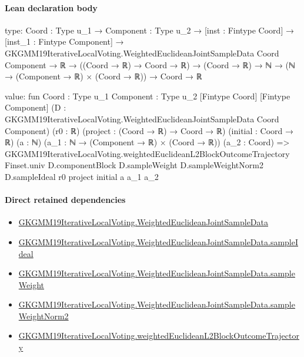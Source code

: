 \documentclass[10pt]{article}
\begin{document}
\paragraph{Lean declaration body}
\begin{ReviewVerbatim}
type:
{Coord : Type u_1} →
  {Component : Type u_2} →
    [inst : Fintype Coord] →
      [inst_1 : Fintype Component] →
        GKGMM19IterativeLocalVoting.WeightedEuclideanJointSampleData Coord Component →
          ℝ → ((Coord → ℝ) → Coord → ℝ) → (Coord → ℝ) → ℕ → (ℕ → (Component → ℝ) × (Coord → ℝ)) → Coord → ℝ

value:
fun {Coord : Type u_1} {Component : Type u_2} [Fintype Coord] [Fintype Component]
    (D : GKGMM19IterativeLocalVoting.WeightedEuclideanJointSampleData Coord Component) (r0 : ℝ)
    (project : (Coord → ℝ) → Coord → ℝ) (initial : Coord → ℝ) (a : ℕ) (a_1 : ℕ → (Component → ℝ) × (Coord → ℝ))
    (a_2 : Coord) =>
  GKGMM19IterativeLocalVoting.weightedEuclideanL2BlockOutcomeTrajectory Finset.univ D.componentBlock D.sampleWeight
    D.sampleWeightNorm2 D.sampleIdeal r0 project initial a a_1 a_2
\end{ReviewVerbatim}

\paragraph{Direct retained dependencies}
\begin{itemize}\raggedright
\item \hyperlink{governing-declaration-b9220a54a8f8ff22}{GKGMM19\allowbreak{}Iterative\allowbreak{}Local\allowbreak{}Voting.\allowbreak{}Weighted\allowbreak{}Euclidean\allowbreak{}Joint\allowbreak{}Sample\allowbreak{}Data}
\item \hyperlink{governing-declaration-0b3dd9036d7079b2}{GKGMM19\allowbreak{}Iterative\allowbreak{}Local\allowbreak{}Voting.\allowbreak{}Weighted\allowbreak{}Euclidean\allowbreak{}Joint\allowbreak{}Sample\allowbreak{}Data.\allowbreak{}sample\allowbreak{}Ideal}
\item \hyperlink{governing-declaration-1e78ab562ae896c2}{GKGMM19\allowbreak{}Iterative\allowbreak{}Local\allowbreak{}Voting.\allowbreak{}Weighted\allowbreak{}Euclidean\allowbreak{}Joint\allowbreak{}Sample\allowbreak{}Data.\allowbreak{}sample\allowbreak{}Weight}
\item \hyperlink{governing-declaration-69fe6a7a24e7eb9f}{GKGMM19\allowbreak{}Iterative\allowbreak{}Local\allowbreak{}Voting.\allowbreak{}Weighted\allowbreak{}Euclidean\allowbreak{}Joint\allowbreak{}Sample\allowbreak{}Data.\allowbreak{}sample\allowbreak{}Weight\allowbreak{}Norm2}
\item \hyperlink{governing-declaration-2ffb4eb2eb6072c4}{GKGMM19\allowbreak{}Iterative\allowbreak{}Local\allowbreak{}Voting.\allowbreak{}weighted\allowbreak{}Euclidean\allowbreak{}L2\allowbreak{}Block\allowbreak{}Outcome\allowbreak{}Trajectory}
\end{itemize}
\clearpage
\hypertarget{library-section-7af9edee67c68478}{}
\end{document}

